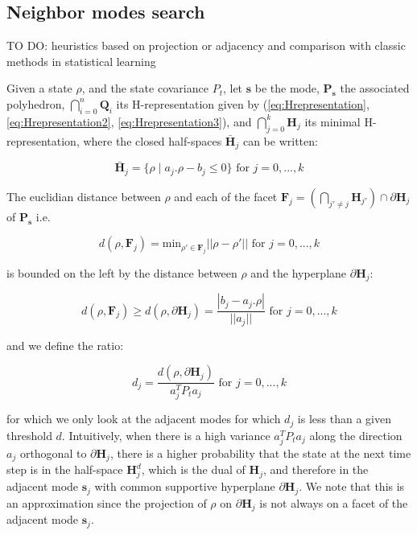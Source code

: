 \subsection{Neighbor modes search}

TO DO: heuristics based on projection or adjacency and comparison with classic methods in statistical learning 

Given a state $\rho$, and the state covariance $P_{t}$, let $\boldsymbol s$ be the mode, $\textbf{P}_{\boldsymbol s}$ the associated polyhedron, $\bigcap_{i=0}^{n} \textbf{Q}_{i}$ its H-representation given by (\ref{eq:Hrepresentation}, \ref{eq:Hrepresentation2}, \ref{eq:Hrepresentation3}), and $\bigcap_{j=0}^{k} \textbf{H}_{j}$ its minimal H-representation, where the closed half-spaces $\bar{\textbf{H}}_{j}$ can be written:

\begin{equation}
\bar{\textbf{H}}_{j} = \{\rho \mid a_{j}.\rho-b_{j} \leq 0\} \text{ for }j=0,...,k
\label{eq:halfSpace}
\end{equation}

\noindent The euclidian distance between $\rho$ and each of the facet $\textbf{F}_{j}=(\bigcap_{j'\neq j}\textbf{H}_{j'})\cap\partial\textbf{H}_{j}$ of $\textbf{P}_{\boldsymbol s}$ i.e.

\begin{equation}
d(\rho,\textbf{F}_{j}) = \text{min}_{\rho'\in \textbf{F}_{j}} ||\rho-\rho'|| \text{ for }j=0,...,k
\label{eq:distance}
\end{equation}

\noindent is bounded on the left by the distance between $\rho$ and the hyperplane $\partial\textbf{H}_{j}$:

\begin{equation}
d(\rho,\textbf{F}_{j})\geq d(\rho,\partial\textbf{H}_{j})=\frac{|b_{j}-a_{j}.\rho|}{||a_{j}||} \text{ for }j=0,...,k
\label{eq:lowerBound}
\end{equation}

\noindent and we define the ratio:

\begin{equation}
d_{j}=\frac{d(\rho,\partial\textbf{H}_{j})}{a^{T}_{j} P_{t} a_{j}}\text{ for }j=0,...,k
\label{eq:ratio}
\end{equation}

\noindent for which we only look at the adjacent modes for which $d_{j}$ is less than a given threshold $d$. Intuitively, when there is a high variance $a^{T}_{j} P_{t} a_{j}$ along the direction $a_{j}$ orthogonal to $\partial\textbf{H}_{j}$, there is a higher probability that the state at the next time step is in the half-space $\textbf{H}^{d}_{j}$, which is the dual of $\textbf{H}_{j}$, and therefore in the adjacent mode $\boldsymbol s_{j}$ with common supportive hyperplane $\partial\textbf{H}_{j}$. We note that this is an approximation since the projection of $\rho$ on $\partial\textbf{H}_{j}$ is not always on a facet of the adjacent mode $\boldsymbol s_{j}$.

